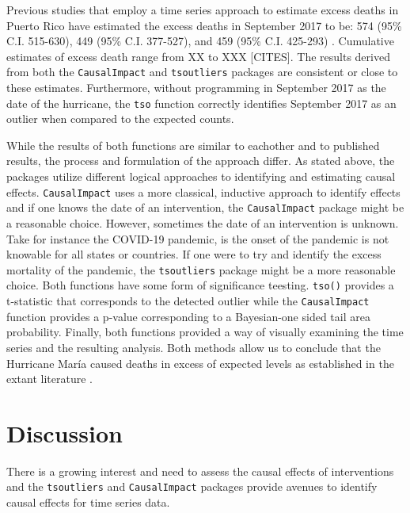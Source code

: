 \documentclass[12pt]{article}
\begin{document}
Previous studies that employ a time series approach to estimate excess
deaths in Puerto Rico have estimated the excess deaths in September 2017
to be: 574 (95\% C.I. 515-630), 449 (95\% C.I. 377-527), and 459 (95\%
C.I. 425-293)
\citep{rivera_estimating_2018, santos2018differential, santos2018use}.
Cumulative estimates of excess death range from XX to XXX {[}CITES{]}.
The results derived from both the \texttt{CausalImpact} and
\texttt{tsoutliers} packages are consistent or close to these estimates.
Furthermore, without programming in September 2017 as the date of the
hurricane, the \texttt{tso} function correctly identifies September 2017
as an outlier when compared to the expected counts.

While the results of both functions are similar to eachother and to
published results, the process and formulation of the approach differ.
As stated above, the packages utilize different logical approaches to
identifying and estimating causal effects. \texttt{CausalImpact} uses a
more classical, inductive approach to identify effects and if one knows
the date of an intervention, the \texttt{CausalImpact} package might be
a reasonable choice. However, sometimes the date of an intervention is
unknown. Take for instance the COVID-19 pandemic, is the onset of the
pandemic is not knowable for all states or countries. If one were to try
and identify the excess mortality of the pandemic, the
\texttt{tsoutliers} package might be a more reasonable choice. Both
functions have some form of significance teesting. \texttt{tso()}
provides a t-statistic that corresponds to the detected outlier while
the \texttt{CausalImpact} function provides a p-value corresponding to a
Bayesian-one sided tail area probability. Finally, both functions
provided a way of visually examining the time series and the resulting
analysis. Both methods allow us to conclude that the Hurricane María
caused deaths in excess of expected levels as established in the extant
literature \citep{sandberg2019all}.

\hypertarget{discussion}{%
\section{Discussion}\label{discussion}}

There is a growing interest and need to assess the causal effects of
interventions \citep{pearl2009causality} and the \texttt{tsoutliers} and
\texttt{CausalImpact} packages provide avenues to identify causal
effects for time series data.
\end{document}
